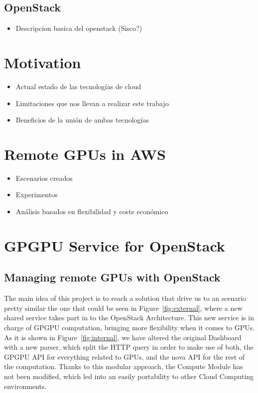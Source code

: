 \documentclass[a4paper,twoside]{article}
\begin{document}
\subsection{OpenStack}
\label{sec:openstack}
\begin{itemize}
\item Descripcion basica del openstack (Sisco?)
\end{itemize}

\section{Motivation}
\label{sec:motivation}

\begin{itemize}
\item Actual estado de las tecnolog\'ias de cloud
\item Limitaciones que nos llevan a realizar este trabajo
\item Beneficios de la unión de ambas tecnolog\'ias
\end{itemize}


\section{Remote GPUs in AWS}
\label{sec:rgpuaws}

\begin{itemize}
\item Escenarios creados
\item Experimentos
\item An\'alisis basados en flexibilidad y coste econ\'omico
\end{itemize}

\section{GPGPU Service for OpenStack}
\subsection{Managing remote GPUs with OpenStack}
The main idea of this project is to reach a solution that drive us to an scenario pretty similar the one that could be seen in Figure~\ref{fig:external}, where a new shared service takes part in to the OpenStack Architecture.
This new service is in charge of GPGPU computation, bringing more flexibility when it comes to GPUs.
As it is shown in Figure~\ref{fig:internal}, we have altered the original Dashboard with a new parser, 
which split the HTTP query in order to make use of both, the GPGPU API for everything related to GPUs, and the nova API for the rest of the computation. 
Thanks to this modular approach, the Compute Module has not been modified, which led into an easily portability to other Cloud Computing environments.
\end{document}
